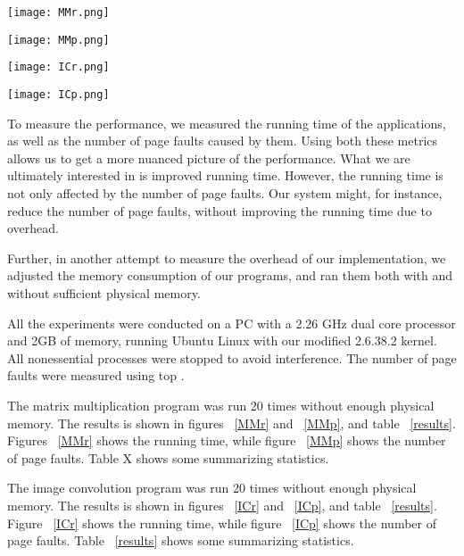 \documentclass[10pt,a4paper,twocolumn]{article}
\begin{document}
\begin{figure*}[htbp]
\centering
\texttt{[image: MMr.png]}
\caption{\emph{\small Distribution of running time for matrix multiplication}}
\label{MMr}
\end{figure*}

\begin{figure*}[htbp]
\centering
\texttt{[image: MMp.png]}
\caption{\emph{\small Distribution of page faults for matrix multiplication}}
\label{MMp}
\end{figure*}

\begin{figure*}[htbp]
\centering
\texttt{[image: ICr.png]}
\caption{\emph{\small Distribution of running time for image convolution}}
\label{ICr}
\end{figure*}

\begin{figure*}[htbp]
\centering
\texttt{[image: ICp.png]}
\caption{\emph{\small Distribution of page faults for image convolution}}
\label{ICp}
\end{figure*}

To measure the performance, we measured the running time of the applications, as well as the number
of page faults caused by them. Using both these metrics allows us to get a more nuanced picture of
the performance. What we are ultimately interested in is improved running time. However, the running
time is not only affected by the number of page faults. Our system might, for instance, reduce the
number of page faults, without improving the running time due to overhead.

Further, in another attempt to measure the overhead of our implementation, we adjusted the memory
consumption of our programs, and ran them both with and without sufficient physical memory.

All the experiments were conducted on a PC with a 2.26 GHz dual core processor and 2GB of memory,
running Ubuntu Linux with our modified 2.6.38.2 kernel. All nonessential processes were stopped to
avoid interference. The number of page
faults were measured using top \cite{TOP}.

The matrix multiplication program was run 20 times without enough physical memory. The results is
shown in figures ~\ref{MMr} and ~\ref{MMp}, and table ~\ref{results}. Figures ~\ref{MMr} shows the
running time, while figure ~\ref{MMp} shows the
number of page faults. Table X shows some summarizing statistics.

The image convolution program was run 20 times without enough physical memory. The results is shown
in figures ~\ref{ICr} and ~\ref{ICp}, and table ~\ref{results}. Figure ~\ref{ICr} shows the running
time, while figure ~\ref{ICp} shows the number
of page faults. Table ~\ref{results} shows some summarizing statistics.
\end{document}

